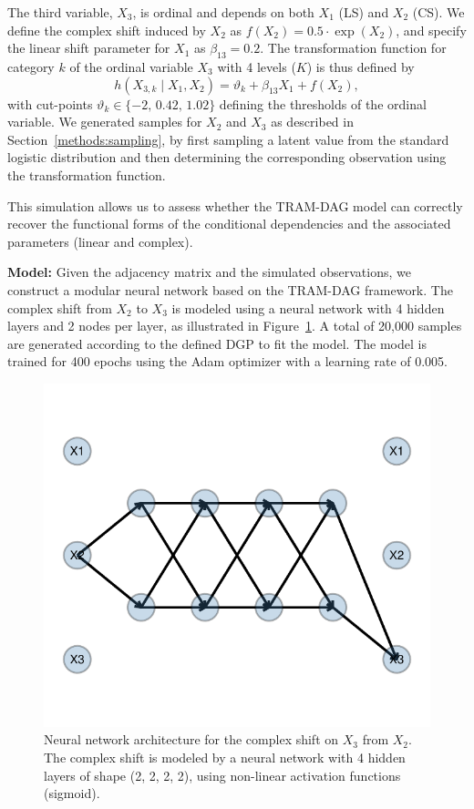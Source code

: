 The third variable, $X_3$, is ordinal and depends on both $X_1$ (LS) and $X_2$ (CS). We define the complex shift induced by $X_2$ as $f(X_2) = 0.5 \cdot \exp(X_2)$, and specify the linear shift parameter for $X_1$ as $\beta_{13} = 0.2$. The transformation function for category $k$ of the ordinal variable $X_3$ with 4 levels ($K$) is thus defined by 
\[
h(X_{3,k} \mid X_1, X_2) = \vartheta_k + \beta_{13} X_1 + f(X_2),
\]
with cut-points $\vartheta_k \in \{-2,\, 0.42,\, 1.02\}$ defining the thresholds of the ordinal variable. We generated samples for $X_2$ and $X_3$ as described in Section~\ref{methods:sampling}, by first sampling a latent value from the standard logistic distribution and then determining the corresponding observation using the transformation function.

This simulation allows us to assess whether the TRAM-DAG model can correctly recover the functional forms of the conditional dependencies and the associated parameters (linear and complex).

\textbf{Model:} Given the adjacency matrix and the simulated observations, we construct a modular neural network based on the TRAM-DAG framework. The complex shift from $X_2$ to $X_3$ is modeled using a neural network with 4 hidden layers and 2 nodes per layer, as illustrated in Figure~\ref{fig:exp1_CS}. A total of 20,000 samples are generated according to the defined DGP to fit the model. The model is trained for 400 epochs using the Adam optimizer \citep{kingma2015} with a learning rate of 0.005.



\begin{figure}[H]
\centering
\includegraphics[width=0.5\linewidth]{img/exp1_CS.pdf}
\caption{Neural network architecture for the complex shift on $X_3$ from $X_2$. The complex shift is modeled by a neural network with 4 hidden layers of shape (2, 2, 2, 2), using non-linear activation functions (sigmoid).}
\label{fig:exp1_CS}
\end{figure}




